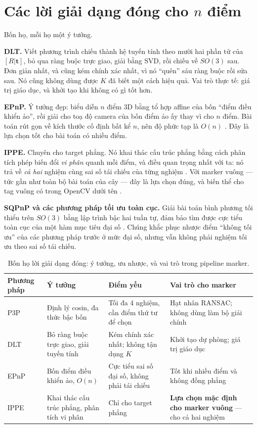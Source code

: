 \documentclass[../../marker.tex]{subfiles}
\begin{document}
\section{Các lời giải dạng đóng cho \texorpdfstring{\(n\)}{n} điểm}

Bốn họ, mỗi họ một ý tưởng.

\textbf{DLT.} Viết phương trình chiếu thành hệ tuyến tính theo mười hai phần tử của \([R|\mathbf{t}]\), bỏ qua ràng buộc trực giao, giải bằng SVD, rồi chiếu về \(SO(3)\) sau. Đơn giản nhất, và cũng kém chính xác nhất, vì nó ``quên'' sáu ràng buộc rồi sửa sau. Nó cũng không dùng được \(K\) đã biết một cách hiệu quả. Vai trò thực tế: giá trị giáo dục, và khởi tạo khi không có gì tốt hơn.

\textbf{EPnP.} Ý tưởng đẹp: biểu diễn \(n\) điểm 3D bằng tổ hợp affine của bốn ``điểm điều khiển ảo'', rồi giải cho toạ độ camera của bốn điểm ảo ấy thay vì cho \(n\) điểm. Bài toán rút gọn về kích thước cố định bất kể \(n\), nên độ phức tạp là \(O(n)\) \cite{lepetit2009epnp}. Đây là lựa chọn tốt cho bài toán có nhiều điểm.

\textbf{IPPE.} Chuyên cho target phẳng. Nó khai thác cấu trúc phẳng bằng cách phân tích phép biến đổi \emph{vi phân} quanh mỗi điểm, và điều quan trọng nhất với ta: nó trả về \emph{cả hai} nghiệm cùng sai số tái chiếu của từng nghiệm \cite{collins2014ippe}. Với marker vuông --- tức gần như toàn bộ bài toán của cây --- đây là lựa chọn đúng, và biến thể cho tag vuông có trong OpenCV dưới tên .

\textbf{SQPnP và các phương pháp tối ưu toàn cục.} Giải bài toán bình phương tối thiểu trên \(SO(3)\) bằng lập trình bậc hai tuần tự, đảm bảo tìm được cực tiểu toàn cục của một hàm mục tiêu đại số \cite{terzakis2020sqpnp}. Chúng khắc phục nhược điểm ``không tối ưu'' của các phương pháp trước ở mức đại số, nhưng vẫn không phải nghiệm tối ưu theo sai số tái chiếu.

\begin{table}[H]\centering\small
\caption{Bốn họ lời giải dạng đóng: ý tưởng, ưu nhược, và vai trò trong pipeline marker.}
\label{tab:a03-pnp}
\begin{tabularx}{\linewidth}{@{}L{2.0cm}L{3.5cm}L{3.0cm}Y@{}}
\toprule
\textbf{Phương pháp} & \textbf{Ý tưởng} & \textbf{Điểm yếu} & \textbf{Vai trò cho marker}\\
\midrule
P3P & Định lý cosin, đa thức bậc bốn & Tối đa 4 nghiệm, cần điểm thứ tư để chọn & Hạt nhân RANSAC; không dùng làm bộ giải chính\\
DLT & Bỏ ràng buộc trực giao, giải tuyến tính & Kém chính xác nhất; không tận dụng \(K\) & Khởi tạo dự phòng; giá trị giáo dục\\
EPnP \cite{lepetit2009epnp} & Bốn điểm điều khiển ảo, \(O(n)\) & Cực tiểu sai số đại số, không phải tái chiếu & Tốt khi nhiều điểm và không đồng phẳng\\
IPPE \cite{collins2014ippe} & Khai thác cấu trúc phẳng, phân tích vi phân & Chỉ cho target phẳng & \textbf{Lựa chọn mặc định cho marker vuông} --- cho cả hai nghiệm\\
\bottomrule
\end{tabularx}
\end{table}
\end{document}
